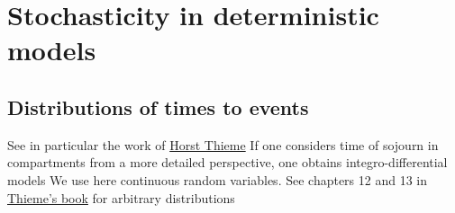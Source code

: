 \documentclass[aspectratio=169]{beamer}
\begin{document}
% 
% 



\section{Stochasticity in deterministic models}


\subsection{Distributions of times to events}

\begin{frame}
See in particular the work of \href{https://scholar.google.ca/citations?user=o7R6ZHMAAAAJ}{Horst Thieme}
\vfill
If one considers time of sojourn in compartments from a more detailed perspective, one obtains integro-differential models
\vfill
We use here continuous random variables. See chapters 12 and 13 in \href{https://press.princeton.edu/books/paperback/9780691092911/mathematics-in-population-biology}{Thieme's book} for arbitrary distributions
\end{frame}
\end{document}
